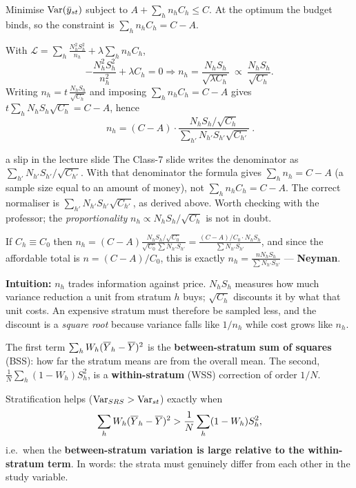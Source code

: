  Minimise $\operatorname{Var}(\bar{y}_{st})$ subject to $A+\sum_hn_hC_h\le C$. At the optimum the budget
binds, so the constraint is $\sum_hn_hC_h=C-A$.

 With $\mathcal L=\sum_h\frac{N_h^2S_h^2}{n_h}+\lambda\sum_hn_hC_h$,
\[
  -\frac{N_h^2S_h^2}{n_h^2}+\lambda C_h=0
  \Longrightarrow n_h=\frac{N_hS_h}{\sqrt{\lambda C_h}}\ \propto\ \frac{N_hS_h}{\sqrt{C_h}} .
\]
Writing $n_h=t\,\frac{N_hS_h}{\sqrt{C_h}}$ and imposing $\sum_hn_hC_h=C-A$ gives
$t\sum_hN_hS_h\sqrt{C_h}=C-A$, hence
\[
  \boxed{\ n_h=(C-A)\cdot\frac{N_hS_h/\sqrt{C_h}}{\sum_{h'}N_{h'}S_{h'}\sqrt{C_{h'}}}\ } .
\]

\begin{trap}{a slip in the lecture slide}
The Class-7 slide writes the denominator as $\sum_{h'}N_{h'}S_{h'}/\sqrt{C_{h'}}$. With that
denominator the formula gives $\sum_hn_h=C-A$ (a sample size equal to an amount of money), not
$\sum_hn_hC_h=C-A$. The correct normaliser is $\sum_{h'}N_{h'}S_{h'}\sqrt{C_{h'}}$, as derived
above. Worth checking with the professor; the \emph{proportionality} $n_h\propto N_hS_h/\sqrt{C_h}$
is not in doubt.
\end{trap}

 If $C_h\equiv C_0$ then $n_h=(C-A)\frac{N_hS_h/\sqrt{C_0}}{\sqrt{C_0}\sum N_{h'}S_{h'}}
=\frac{(C-A)/C_0\cdot N_hS_h}{\sum N_{h'}S_{h'}}$, and since the affordable total is
$n=(C-A)/C_0$, this is exactly $n_h=\frac{nN_hS_h}{\sum N_{h'}S_{h'}}$ --- \textbf{Neyman}.
\checkmark

\textbf{Intuition:} $n_h$ trades information against price. $N_hS_h$ measures how much variance
reduction a unit from stratum $h$ buys; $\sqrt{C_h}$ discounts it by what that unit costs. An
expensive stratum must therefore be sampled less, and the discount is a \emph{square root}
because variance falls like $1/n_h$ while cost grows like $n_h$.

 The first term $\sum_hW_h(\overline{Y}_h-\overline{Y})^2$ is the \textbf{between-stratum sum of squares}
(BSS): how far the stratum means are from the overall mean. The second,
$\frac1N\sum_h(1-W_h)S_h^2$, is a \textbf{within-stratum} (WSS) correction of order $1/N$.

 Stratification helps ($\operatorname{Var}_{SRS}>\operatorname{Var}_{st}$) exactly when
\[
  \sum_hW_h(\overline{Y}_h-\overline{Y})^2>\frac1N\sum_h(1-W_h)S_h^2 ,
\]
i.e.\ when the \textbf{between-stratum variation is large relative to the within-stratum term}.
In words: the strata must genuinely differ from each other in the study variable.

